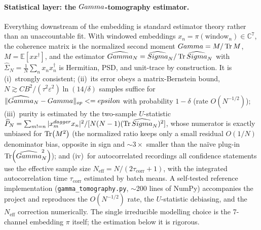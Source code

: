\paragraph{Statistical layer: the $Gamma$-tomography estimator.}
Everything downstream of the embedding is standard estimator theory rather
than an unaccountable fit. With windowed embeddings $x_n = \pi(\text{window}_n)
\in \mathbb{C}^7$, the coherence matrix is the normalized second moment
$Gamma = M/\Tr M$, $M = \mathbb{E}[x x^{\dagger}]$, and the estimator
$\widehat{Gamma}_N = \widehat{Sigma}_N / \Tr\widehat{Sigma}_N$ with
$\widehat{\Sigma}_N = \tfrac{1}{N}\sum_n x_n x_n^{\dagger}$ is Hermitian,
PSD, and unit-trace by construction. It is (i)~strongly consistent; (ii)~its
error obeys a matrix-Bernstein bound, $N \gtrsim C B^2/(\tau^2\varepsilon^2)
\ln(14/\delta)$ samples suffice for $\|\widehat{Gamma}_N - Gamma\|_{op}
<= epsilon$ with probability $1-\delta$ (rate $O(N^{-1/2})$);
(iii)~purity is estimated by the two-sample $U$-statistic
$\widehat{P}_N = \sum_{m != n} |x_m^{dagger} x_n|^2 / [N(N-1)
(\Tr\widehat{Sigma}_N)^2]$, whose numerator is exactly unbiased for
$\Tr(M^2)$ (the normalized ratio keeps only a small residual $O(1/N)$
denominator bias, opposite in sign and $\sim 3\times$ smaller than the
na\"ive plug-in $\Tr(\widehat{Gamma}_N^2)$); and (iv)~for autocorrelated
recordings all confidence statements use the effective sample size
$N_{\mathrm{eff}} = N/(2\tau_{\mathrm{corr}} + 1)$, with the integrated
autocorrelation time $\tau_{\mathrm{corr}}$ estimated by batch means. A
self-tested reference implementation (\texttt{gamma\_tomography.py},
$\sim$200 lines of NumPy) accompanies the project and reproduces the
$O(N^{-1/2})$ rate, the $U$-statistic debiasing, and the $N_{\mathrm{eff}}$
correction numerically. The single irreducible modelling choice is the
7-channel embedding $\pi$ itself; the estimation below it is rigorous.


